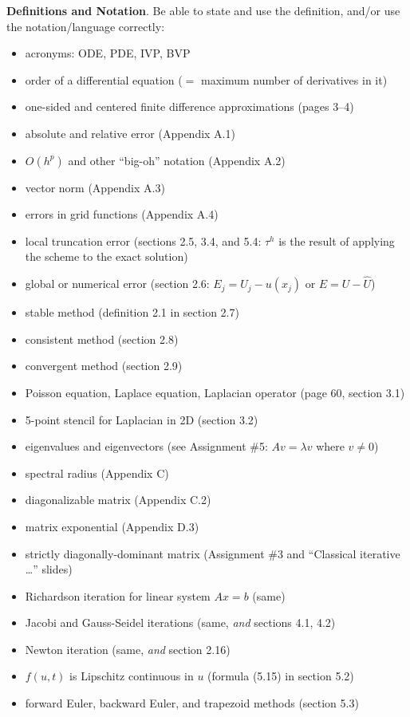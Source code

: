 \documentclass[12pt]{amsart}
\newcommand{\bigspacing}{\renewcommand{\baselinestretch}{1.15}\tiny\normalsize}
\begin{document}
\bigspacing
\noindent \textbf{Definitions and Notation}.  Be able to state and use the definition, and/or use the notation/language correctly:
\begin{itemize}
\item acronyms: ODE, PDE, IVP, BVP
\item order of a differential equation ($=$ maximum number of derivatives in it)
\item one-sided and centered finite difference approximations (pages 3--4)
\item absolute and relative error (Appendix A.1)
\item $O(h^p)$ and other ``big-oh'' notation (Appendix A.2)
\item vector norm (Appendix A.3)
\item errors in grid functions (Appendix A.4)
\item local truncation error (sections 2.5, 3.4, and 5.4: $\tau^h$ is the result of applying the scheme to the exact solution)
\item global or numerical error (section 2.6: $E_j = U_j - u(x_j)$ or $E = U - \hat U$)
\item stable method (definition 2.1 in section 2.7)
\item consistent method (section 2.8)
\item convergent method (section 2.9)
\item Poisson equation, Laplace equation, Laplacian operator (page 60, section 3.1)
\item 5-point stencil for Laplacian in 2D (section 3.2)
\item eigenvalues and eigenvectors (see Assignment \#5: $A v = \lambda v$ where $v\ne 0$)
\item spectral radius (Appendix C)
\item diagonalizable matrix (Appendix C.2)
\item matrix exponential (Appendix D.3)
\item strictly diagonally-dominant matrix (Assignment \#3 and ``Classical iterative \dots'' slides)
\item Richardson iteration for linear system $Ax=b$ (same)
\item Jacobi and Gauss-Seidel iterations (same, \emph{and} sections 4.1, 4.2)
\item Newton iteration (same, \emph{and} section 2.16)
\item $f(u,t)$ is Lipschitz continuous in $u$ (formula (5.15) in section 5.2)
\item forward Euler, backward Euler, and trapezoid methods (section 5.3)
\end{itemize}
\end{document}
